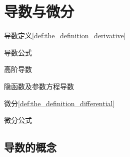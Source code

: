 \setcounter{chapter}{1}

\chapter{导数与微分}

\begin{introduction}
    \item 导数定义\ref{def:the_definition_derivative}
    \item 导数公式
    \item 高阶导数
    \item 隐函数及参数方程导数
    \item 微分\ref{def:the_definition_differential}
    \item 微分公式
\end{introduction}

\section{导数的概念}

